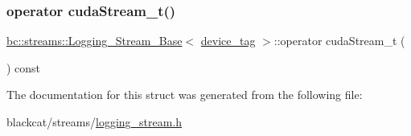 \mbox{\label{structbc_1_1streams_1_1Logging__Stream__Base_3_01device__tag_01_4_a1e263882018f98cc9e52df10ade5a3fc}} 
\subsubsection{\texorpdfstring{operator cuda\+Stream\+\_\+t()}{operator cudaStream\_t()}}
{\footnotesize\ttfamily \hyperlink{structbc_1_1streams_1_1Logging__Stream__Base}{bc\+::streams\+::\+Logging\+\_\+\+Stream\+\_\+\+Base}$<$ \hyperlink{structbc_1_1device__tag}{device\+\_\+tag} $>$\+::operator cuda\+Stream\+\_\+t (\begin{DoxyParamCaption}{ }\end{DoxyParamCaption}) const\hspace{0.3cm}{\ttfamily [inline]}}



The documentation for this struct was generated from the following file\+:\begin{DoxyCompactItemize}
\item 
blackcat/streams/\hyperlink{logging__stream_8h}{logging\+\_\+stream.\+h}\end{DoxyCompactItemize}
